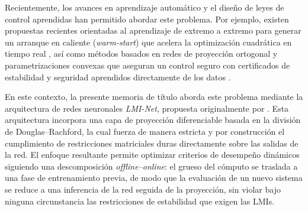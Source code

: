 Recientemente, los avances en aprendizaje automático y el diseño de leyes de control aprendidas han permitido abordar este problema. Por ejemplo, existen propuestas recientes orientadas al aprendizaje de extremo a extremo para generar un arranque en caliente (\textit{warm-start}) que acelera la optimización cuadrática en tiempo real \cite{sambharya2023end}, así como métodos basados en redes de proyección ortogonal y parametrizaciones convexas que aseguran un control seguro con certificados de estabilidad y seguridad aprendidos directamente de los datos \cite{grontas2026pinet, tordesillas2023rayen}.

En este contexto, la presente memoria de título aborda este problema mediante la arquitectura de redes neuronales \textit{LMI-Net}, propuesta originalmente por . Esta arquitectura incorpora una capa de proyección diferenciable basada en la división de Douglas--Rachford, la cual fuerza de manera estricta y por construcción el cumplimiento de restricciones matriciales duras directamente sobre las salidas de la red.  El enfoque resultante permite optimizar criterios de desempeño dinámicos siguiendo una descomposición \textit{offline--online}: el grueso del cómputo se traslada a una fase de entrenamiento previa, de modo que la evaluación de un nuevo sistema se reduce a una inferencia de la red seguida de la proyección, sin violar bajo ninguna circunstancia las restricciones de estabilidad que exigen las LMIs.